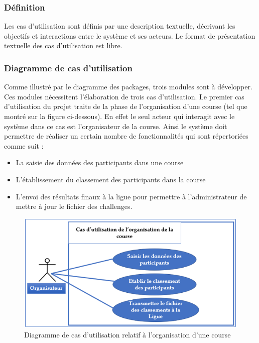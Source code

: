 \subsubsection{Définition}
Les cas d'utilisation sont définis par une description textuelle, décrivant les objectifs et interactions entre le système et ses acteurs. Le format de présentation textuelle des cas d'utilisation est libre.
\subsubsection{Diagramme de cas d’utilisation }
Comme illustré par le diagramme des packages, trois modules sont à développer. Ces modules nécessitent l’élaboration de trois cas d’utilisation. Le premier cas d’utilisation du projet traite de la phase de l’organisation d’une course (tel que montré sur la figure ci-dessous). En effet le seul acteur qui interagit avec le système dans ce cas est l’organisateur de la course. Ainsi le système doit permettre de réaliser un certain nombre de fonctionnalités qui sont répertoriées comme suit :
\begin{itemize} 
\item La saisie des données des participants dans une course
\item  L’établissement du classement des participants dans la course
\item  L’envoi des résultats finaux à la ligue pour permettre à l’administrateur de mettre à jour le fichier des challenges.
\end{itemize} 

\begin{figure}[!h]
	   \center
	   \includegraphics[scale=0.8]{img/Diagramme_cas_utilisation_organisation_course.png}
	   \caption {Diagramme de cas d’utilisation relatif à l’organisation d’une course}
\end{figure}


